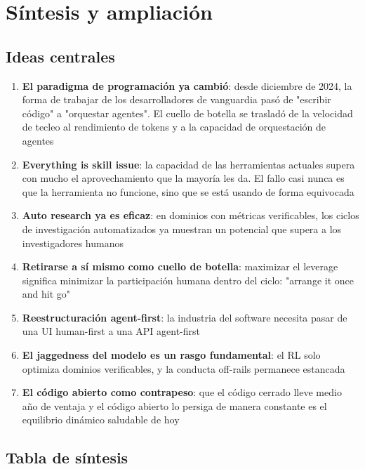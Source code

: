 \documentclass[a4paper]{article}
\begin{document}
\section{Síntesis y ampliación}

\subsection{Ideas centrales}

\begin{enumerate}
    \item \textbf{El paradigma de programación ya cambió}: desde diciembre de 2024, la forma de trabajar de los desarrolladores de vanguardia pasó de "escribir código" a "orquestar agentes". El cuello de botella se trasladó de la velocidad de tecleo al rendimiento de tokens y a la capacidad de orquestación de agentes
    \item \textbf{Everything is skill issue}: la capacidad de las herramientas actuales supera con mucho el aprovechamiento que la mayoría les da. El fallo casi nunca es que la herramienta no funcione, sino que se está usando de forma equivocada
    \item \textbf{Auto research ya es eficaz}: en dominios con métricas verificables, los ciclos de investigación automatizados ya muestran un potencial que supera a los investigadores humanos
    \item \textbf{Retirarse a sí mismo como cuello de botella}: maximizar el leverage significa minimizar la participación humana dentro del ciclo: "arrange it once and hit go"
    \item \textbf{Reestructuración agent-first}: la industria del software necesita pasar de una UI human-first a una API agent-first
    \item \textbf{El jaggedness del modelo es un rasgo fundamental}: el RL solo optimiza dominios verificables, y la conducta off-rails permanece estancada
    \item \textbf{El código abierto como contrapeso}: que el código cerrado lleve medio año de ventaja y el código abierto lo persiga de manera constante es el equilibrio dinámico saludable de hoy
\end{enumerate}

\subsection{Tabla de síntesis}
\end{document}
